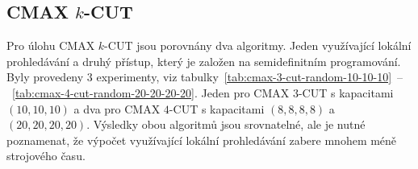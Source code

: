 \begin{table}[h!]
    \begin{center}
    \end{center}
    \caption{MAX $5$-CUT na náhodných grafech řádu $30$.}
    \label{tab:max-5-cut-random}
\end{table}


\subsection{CMAX $k$-CUT}

Pro úlohu CMAX $k$-CUT jsou porovnány dva algoritmy. Jeden využívající lokální prohledávání a druhý přístup, který je založen na semidefinitním programování. Byly provedeny $3$ experimenty, viz tabulky~\ref{tab:cmax-3-cut-random-10-10-10}~--~\ref{tab:cmax-4-cut-random-20-20-20-20}. Jeden pro CMAX $3$-CUT s kapacitami $(10, 10, 10)$ a dva pro CMAX $4$-CUT s kapacitami $(8, 8, 8, 8)$ a $(20, 20, 20, 20)$. Výsledky obou algoritmů jsou srovnatelné, ale je nutné poznamenat, že výpočet využívající lokální prohledávání zabere mnohem méně strojového času.


